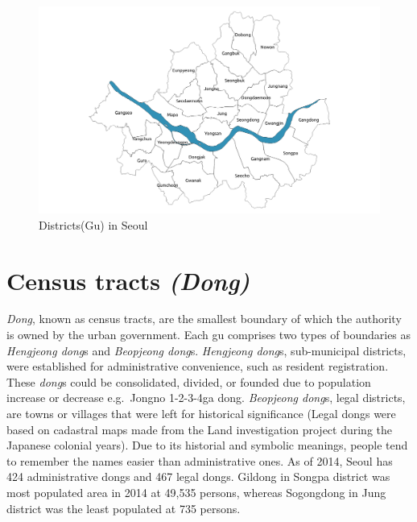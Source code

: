 \documentclass[]{book}
\begin{document}
\begin{figure}

{\centering \includegraphics[width=21.57in]{images/03_gu} 

}

\caption{\label{fig:figs} Districts(Gu) in Seoul}\label{fig:unnamed-chunk-3}
\end{figure}

\section{\texorpdfstring{Census tracts
\emph{(Dong)}}{Census tracts (Dong)}}\label{census-tracts-dong}

\emph{Dong}, known as census tracts, are the smallest boundary of which
the authority is owned by the urban government. Each gu comprises two
types of boundaries as \emph{Hengjeong dong}s and \emph{Beopjeong
dong}s. \emph{Hengjeong dong}s, sub-municipal districts, were
established for administrative convenience, such as resident
registration. These \emph{dong}s could be consolidated, divided, or
founded due to population increase or decrease e.g.~Jongno 1-2-3-4ga
dong. \emph{Beopjeong dong}s, legal districts, are towns or villages
that were left for historical significance (Legal dongs were based on
cadastral maps made from the Land investigation project during the
Japanese colonial years). Due to its historial and symbolic meanings,
people tend to remember the names easier than administrative ones. As of
2014, Seoul has 424 administrative dongs and 467 legal dongs. Gildong in
Songpa district was most populated area in 2014 at 49,535 persons,
whereas Sogongdong in Jung district was the least populated at 735
persons.
\end{document}
